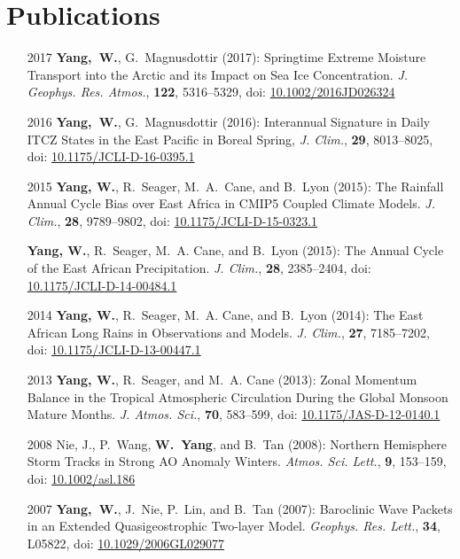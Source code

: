 \documentclass[11pt]{article}
\newcommand{\doi}[1]{ doi: \href{https://doi.org/#1}{#1} }
\begin{document}
\section{Publications}
\begin{itemize}[leftmargin=10ex, itemsep=1ex]
	\item[2017] \textbf{Yang,~W.}, G.~Magnusdottir (2017): Springtime Extreme Moisture Transport into the Arctic and its Impact on Sea Ice Concentration. \emph{J. Geophys. Res. Atmos.}, \textbf{122}, 5316--5329, \doi{10.1002/2016JD026324}

	\item[2016] \textbf{Yang,~W.}, G.~Magnusdottir (2016): Interannual Signature in Daily ITCZ States in the East Pacific in Boreal Spring, \newblock \emph{J. Clim.},  \textbf{29}, 8013--8025, \doi{10.1175/JCLI-D-16-0395.1}

	\item[2015] \textbf{Yang, W.}, R.~Seager, M.~A.~Cane, and B.~Lyon (2015): The Rainfall Annual Cycle Bias over East Africa in CMIP5 Coupled Climate Models.
\newblock \emph{J. Clim.}, \textbf{28}, 9789--9802, \doi{10.1175/JCLI-D-15-0323.1}

	\item[] \textbf{Yang, W.}, R.~Seager, M.~A. Cane, and B.~Lyon (2015): The Annual Cycle of the
  East African Precipitation.
\newblock \emph{J. Clim.}, \textbf{28}, 2385--2404, \doi {10.1175/JCLI-D-14-00484.1}

	\item[2014] \textbf{Yang, W.}, R.~Seager, M.~A. Cane, and B.~Lyon (2014): The East African Long
  Rains in Observations and Models.
\newblock \emph{J. Clim.}, \textbf{27}, 7185--7202, \doi{10.1175/JCLI-D-13-00447.1}

	\item[2013] \textbf{Yang, W.}, R.~Seager, and M.~A. Cane (2013): Zonal Momentum Balance in the
  Tropical Atmospheric Circulation During the Global Monsoon Mature Months.
\newblock \emph{J. Atmos. Sci.}, \textbf{70}, 583--599, \doi{10.1175/JAS-D-12-0140.1}

	\item[2008] Nie, J., P.~Wang, \textbf{W.~Yang}, and B.~Tan (2008): Northern Hemisphere Storm Tracks
  in Strong AO Anomaly Winters.
\newblock \emph{Atmos. Sci. Lett.}, \textbf{9}, 153--159, \doi{10.1002/asl.186}

	\item[2007] \textbf{Yang,~W.}, J.~Nie, P.~Lin, and B.~Tan (2007): Baroclinic Wave Packets in an
  Extended Quasigeostrophic Two-layer Model.  \emph{Geophys. Res. Lett.}, \textbf{34}, L05822,  \doi{10.1029/2006GL029077}
\end{itemize}
\end{document}
